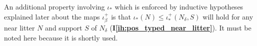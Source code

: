 \documentclass{article}
\theoremstyle{definition}
\theoremstyle{remark}
\newcommand{\ihref}[1]{(\textbf{I\ref{#1}})}
\newcommand{\hsuggest}[1]{{\color{magenta}#1}}
\newcommand{\hsuggest}[1]{}
\begin{document}
\begin{comment}
\hsuggest{[MARKED FOR DELETION after review] We give a detailed description of how to do this. Choose a well-ordering $\leq_0$ of order type $\mu$ on the set of all near-litters.

We refer to a near-litter which is not a litter as a proper near-litter.  With each litter, singleton of atom, or proper near-litter associate a triple of ordinals.  For a litter, the first ordinal will be its position in the order $\leq_0$, and the next two will be 0.  For a singleton of an atom, the first ordinal will be the position in $\leq_0$ of the  litter $L$ which includes it, the second will be the successor of the position of its element in $\leq_L$, and the third will be zero.   For a proper near-litter $N$, the first ordinal will be the supremum of the position in $\leq_0$ of $N^\circ$ and the positions in $\leq_0$ of the litters in containing each element of $N\Delta N^\circ$ ($<\mu$ by cofinality), the second ordinal will be the supremum of the positions of the elements $x$ of $N \Delta N^\circ$ in the respective orders $\leq_{x^\circ}$, where $x^\circ$ is the litter containing $x$ ($<\kappa$ by regularity), and the third will be the successor of the position of $N$ itself in $\leq_0$.

The order on the litters, singletons of atoms, and proper near-litters will be determined by lexicographic order on the associated triples.  This is clearly a well-ordering designed explicitly to have the properties indicated above, and has order type $\mu$ because each item in this order can be seen to have $<\mu$ possible predecessors, on the basis of its first coordinate:  this is obvious for a triple representing a litter;  for a triple representing a singleton of an atom, there are $\kappa$ choices for the second coordinate and one for the third;  for a triple representing a near-litter, there are $\kappa$ choices for the second coordinate, and there are $<\mu$ near litters which are subsets of the union of the litters with position in $\leq_0$ at or before the first coordinate, simply because this union is a set of size $<\mu$ which has $<\mu$ subsets because $\mu$ is strong limit, so there are $<\mu$ possible values for the third coordinate.}
\end{comment}


An additional property involving $\iota_*$ which is enforced by inductive hypotheses explained later about the maps $\iota_\beta^+$ is that $\iota_*(N) \leq \iota_*^+(N_\delta,S)$ will hold for any near litter $N$ and support $S$ of $N_\delta$ \ihref{ih:pos_typed_near_litter}.  It must be noted here because it is shortly used.
\end{document}
